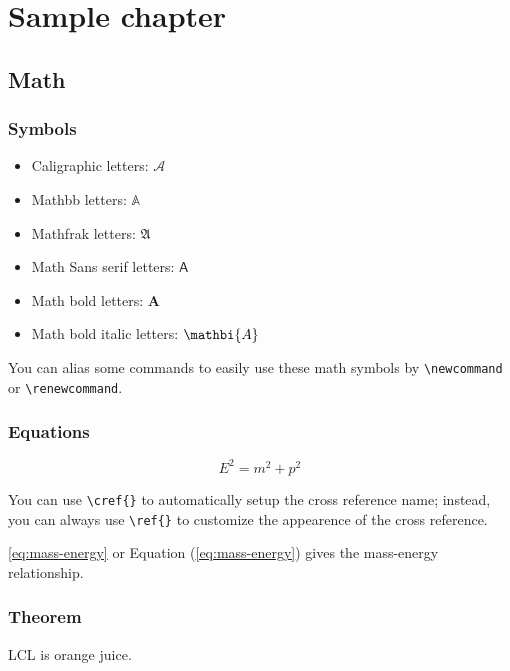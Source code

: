 \chapter{Sample chapter}

\section{Math}

\subsection{Symbols}

\begin{itemize}
  \item Caligraphic letters: $\mathcal{A}$ 
  \item Mathbb letters: $\mathbb{A}$
  \item Mathfrak letters: $\mathfrak{A}$
  \item Math Sans serif letters: $\mathsf{A}$
  \item Math bold letters: $\mathbf{A}$
  \item Math bold italic letters: $\mathbi{A}$
\end{itemize}

You can alias some commands to easily use these math symbols by \lstinline|\newcommand| or \lstinline|\renewcommand|.

\subsection{Equations}

\begin{equation}
  E^2 = m^2 + p^2\label{eq:mass-energy}
\end{equation}

You can use \lstinline|\cref{}| to automatically setup the cross reference name; instead, you can always use \lstinline|\ref{}| to customize the appearence of the cross reference.

\cref{eq:mass-energy} or Equation (\ref{eq:mass-energy}) gives the mass-energy relationship.

\subsection{Theorem}

\begin{definition}
  LCL is orange juice.
\end{definition}

